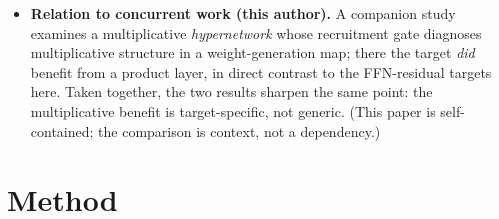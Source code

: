 \documentclass{article}
\begin{document}
\begin{itemize}
  \citep{shazeer2020glu} are \emph{explicitly} multiplicative; we include one (llama-160m). A
  central finding is that this multiplicative form does \emph{not} make the residual
  recoverable by a single low-order product (Section~\ref{sec:residual}).
\item \textbf{Relation to concurrent work (this author).} A companion study
  \citep{whipp2026pi} examines a multiplicative \emph{hypernetwork} whose recruitment gate
  diagnoses multiplicative structure in a weight-generation map; there the target \emph{did}
  benefit from a product layer, in direct contrast to the FFN-residual targets here. Taken together, the two results sharpen the same point: the multiplicative benefit is
  target-specific, not generic. (This paper is self-contained; the comparison is context, not a dependency.)
\end{itemize}

\section{Method}
\label{sec:method}
\end{document}

